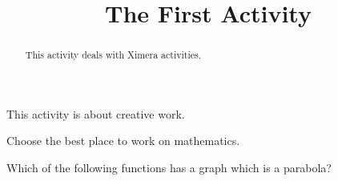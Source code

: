 \documentclass{ximera}
\title{The First Activity}
\begin{document}
  
\begin{abstract}  
This activity deals with Ximera activities.  
\end{abstract}  
\maketitle  
This activity is about creative work.  
\begin{exercise}  
  Choose the best place to work on mathematics.  
  \begin{multipleChoice}  
  \end{multipleChoice}  
\end{exercise}  
\begin{question}  
	Which of the following functions has a graph which is a parabola?  
	\begin{multipleChoice}  
	\end{multipleChoice}  
\end{question} 
\end{document}
